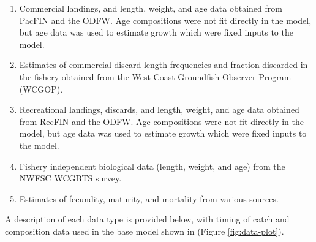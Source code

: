 \documentclass[11pt,
  english,
  a4paper,
]{article}
\begin{document}
\begin{enumerate}
\def\labelenumi{\arabic{enumi}.}
\item

  Commercial landings, and length, weight, and age data obtained from PacFIN and the ODFW. Age compositions were not fit directly in the model, but age data was used to estimate growth which were fixed inputs to the model.

  \tagmcend\tagstructend\tagstructend
\item

  Estimates of commercial discard length frequencies and fraction discarded in the fishery obtained from the West Coast Groundfish Observer Program (WCGOP).

  \tagmcend\tagstructend\tagstructend
\item

  Recreational landings, discards, and length, weight, and age data obtained from RecFIN and the ODFW. Age compositions were not fit directly in the model, but age data was used to estimate growth which were fixed inputs to the model.

  \tagmcend\tagstructend\tagstructend
\item

  Fishery independent biological data (length, weight, and age) from the NWFSC WCGBTS survey.

  \tagmcend\tagstructend\tagstructend
\item

  Estimates of fecundity, maturity, and mortality from various sources.

  \tagmcend\tagstructend\tagstructend
\end{enumerate}

\tagstructend


A description of each data type is provided below, with timing of catch and composition data used in the base model shown in (Figure \ref{fig:data-plot}).

\leavevmode\tagmcend\tagstructend\par
\end{document}
